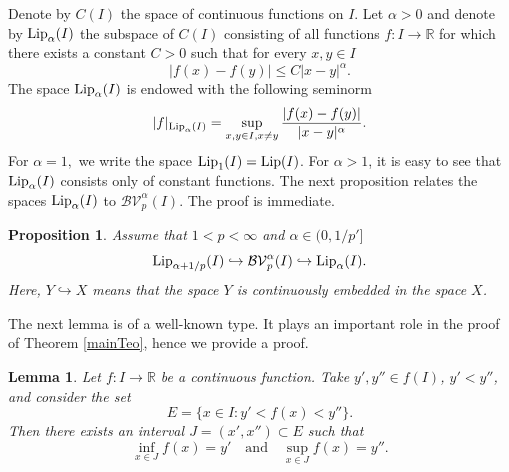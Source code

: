 \documentclass{amsart}
\newtheorem{prop}[theorem]{Proposition}
\newtheorem{lem}[theorem]{Lemma}
\numberwithin{equation}{section}
\begin{document}
Denote by $C(I)$ the space of continuous functions on $I$. Let $\alpha>0$ and denote by ${\rm Lip}_\alpha(I)$ the subspace of $C(I)$ consisting of all functions $f:I\rightarrow\mathbb{R}$ for which there exists a constant $C>0$ such that for every $x,y\in I$
\begin{equation}
    \nonumber
    |f(x)-f(y)|\le C|x-y|^\alpha.
\end{equation}
The space ${\rm Lip}_\alpha(I)$ is endowed with the following seminorm
\begin{equation}
    \nonumber
    |f|_{{\rm Lip}_\alpha(I)}=\sup_{x,y\in I, x\neq y}\frac{|f(x)-f(y)|}{|x-y|^\alpha}.
\end{equation}
For $\alpha=1,$ we write the space ${\rm Lip}_1(I)={\rm Lip}(I)$. For $\alpha>1$, it is easy to see that ${\rm Lip}_\alpha(I)$ consists only of constant functions. The next proposition relates the spaces ${\rm Lip}_\alpha(I)$ to $\mathcal{BV}_p^\alpha(I)$. The proof is immediate.
\begin{prop}
    \label{contProp}
    Assume that $1<p<\infty$ and $\alpha\in(0,1/p']$
    \begin{equation}
        \nonumber
        {\rm Lip}_{\alpha+1/p}(I)\hookrightarrow\mathcal{BV}_p^\alpha(I)\hookrightarrow{\rm Lip}_\alpha(I).
    \end{equation}
    Here, $Y\hookrightarrow X$ means that the space $Y$ is continuously embedded in the space $X$. 
\end{prop}
The next lemma is of a well-known type. It plays an important role in the proof of Theorem \ref{mainTeo}, hence we provide a proof.
\begin{lem}
    \label{mainLemma}
    Let $f:I\rightarrow\mathbb{R}$ be a continuous function. Take $y',y''\in f(I)$, $y'<y''$, and consider the set
    $$
    E=\{x\in I:y'<f(x)<y''\}.
    $$
    Then there exists an interval $J=(x',x'')\subset E$ such that
    \begin{equation}
    \label{extremal}
        \inf_{x\in J}f(x)=y'\quad\text{and}\quad\sup_{x\in J}f(x)=y''.
    \end{equation}
\end{lem}
\end{document}

